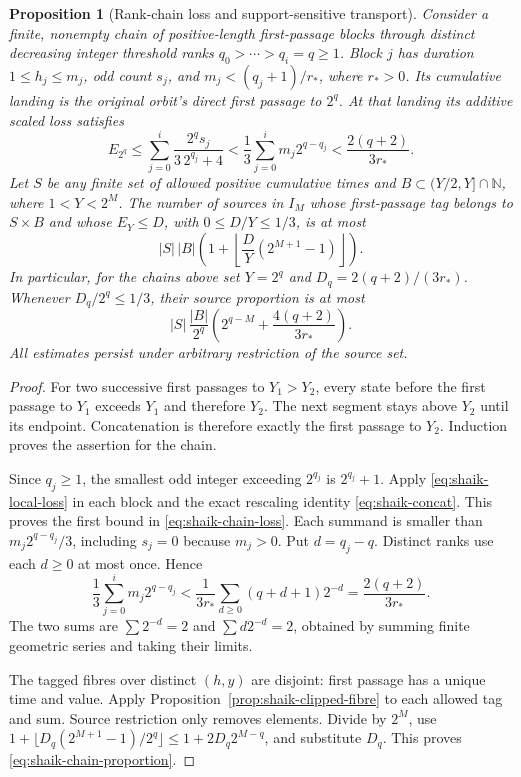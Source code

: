\documentclass[11pt]{article}
\newtheorem{proposition}{Proposition}
\theoremstyle{remark}\newtheorem{remark}[proposition]{Remark}
\newcommand{\NN}{\mathbb N}
\begin{document}
\begin{proposition}[Rank-chain loss and support-sensitive transport]
\label{prop:shaik-chain-transport}
Consider a finite, nonempty chain of positive-length first-passage
blocks through distinct decreasing integer threshold ranks
\(q_0>\cdots>q_i=q\ge1\). Block \(j\) has duration
\(1\le h_j\le m_j\), odd count \(s_j\), and
\(m_j<(q_j+1)/r_*\), where \(r_*>0\).
Its cumulative landing is the original orbit's direct first passage
to \(2^q\). At that landing its additive scaled loss satisfies
\begin{equation}\label{eq:shaik-chain-loss}
 E_{2^q}\le
 \sum_{j=0}^i\frac{2^q s_j}{3\,2^{q_j}+4}
 <\frac13\sum_{j=0}^i m_j2^{q-q_j}
 <\frac{2(q+2)}{3r_*}.
\end{equation}
Let \(S\) be any finite set of allowed positive cumulative times and
\(B\subset(Y/2,Y]\cap\NN\), where \(1<Y<2^M\). The number of
sources in \(I_M\) whose first-passage tag belongs to \(S\times B\)
and whose \(E_Y\le D\), with \(0\le D/Y\le1/3\), is at most
\begin{equation}\label{eq:shaik-transport}
 |S|\,|B|\left(1+
       \left\lfloor\frac D Y(2^{M+1}-1)\right\rfloor\right).
\end{equation}
In particular, for the chains above set \(Y=2^q\) and
\(D_q=2(q+2)/(3r_*)\). Whenever \(D_q/2^q\le1/3\), their
source proportion is at most
\begin{equation}\label{eq:shaik-chain-proportion}
 |S|\,\frac{|B|}{2^q}
       \left(2^{q-M}+\frac{4(q+2)}{3r_*}\right).
\end{equation}
All estimates persist under arbitrary restriction of the source set.
\end{proposition}
\begin{proof}
For two successive first passages to \(Y_1>Y_2\), every state before
the first passage to \(Y_1\) exceeds \(Y_1\) and therefore \(Y_2\).
The next segment stays above \(Y_2\) until its endpoint.
Concatenation is therefore exactly the first passage to \(Y_2\).
Induction proves the assertion for the chain.

Since \(q_j\ge1\), the smallest odd integer exceeding \(2^{q_j}\)
is \(2^{q_j}+1\). Apply \eqref{eq:shaik-local-loss} in each block
and the exact rescaling identity \eqref{eq:shaik-concat}.
This proves the first bound in \eqref{eq:shaik-chain-loss}.
Each summand is smaller than \(m_j2^{q-q_j}/3\), including
\(s_j=0\) because \(m_j>0\). Put \(d=q_j-q\).
Distinct ranks use each \(d\ge0\) at most once. Hence
\[
 \frac13\sum_{j=0}^i m_j2^{q-q_j}
 <\frac1{3r_*}\sum_{d\ge0}(q+d+1)2^{-d}
 =\frac{2(q+2)}{3r_*}.
\]
The two sums are \(\sum 2^{-d}=2\) and \(\sum d2^{-d}=2\),
obtained by summing finite geometric series and taking their limits.

The tagged fibres over distinct \((h,y)\) are disjoint: first passage
has a unique time and value. Apply
Proposition~\ref{prop:shaik-clipped-fibre} to each allowed tag and sum.
Source restriction only removes elements. Divide by \(2^M\), use
\(1+\lfloor D_q(2^{M+1}-1)/2^q\rfloor
 \le1+2D_q2^{M-q}\), and substitute \(D_q\).
This proves \eqref{eq:shaik-chain-proportion}.
\end{proof}
\end{document}
